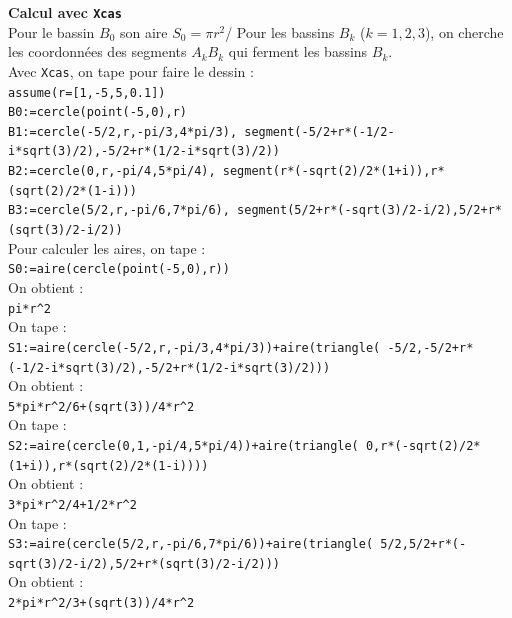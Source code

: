 \documentclass[a4paper,11pt]{book}
\begin{document}
{\bf Calcul avec {\tt Xcas}}\\
Pour le bassin $B_0$ son aire $S_0=\pi r^2$/
Pour les bassins $B_k$ ($k=1,2,3$), on cherche les coordonn\'ees des segments 
$A_kB_k$ qui ferment les bassins $B_k$.\\
Avec {\tt Xcas}, on tape pour faire le dessin :\\
{\tt assume(r=[1,-5,5,0.1])}\\
{\tt B0:=cercle(point(-5,0),r)}\\
{\tt B1:=cercle(-5/2,r,-pi/3,4*pi/3),
segment(-5/2+r*(-1/2-i*sqrt(3)/2),-5/2+r*(1/2-i*sqrt(3)/2))}\\
{\tt B2:=cercle(0,r,-pi/4,5*pi/4),
segment(r*(-sqrt(2)/2*(1+i)),r*(sqrt(2)/2*(1-i)))}\\
{\tt B3:=cercle(5/2,r,-pi/6,7*pi/6),
segment(5/2+r*(-sqrt(3)/2-i/2),5/2+r*(sqrt(3)/2-i/2))}\\
Pour calculer les aires, on tape :\\
{\tt S0:=aire(cercle(point(-5,0),r))}\\
On obtient :\\
{\tt pi*r\verb|^|2}\\
On tape :\\
{\tt S1:=aire(cercle(-5/2,r,-pi/3,4*pi/3))+aire(triangle(
 -5/2,-5/2+r*(-1/2-i*sqrt(3)/2),-5/2+r*(1/2-i*sqrt(3)/2)))}\\
On obtient :\\
{\tt 5*pi*r\verb|^|2/6+(sqrt(3))/4*r\verb|^|2}\\
On tape :\\
{\tt S2:=aire(cercle(0,1,-pi/4,5*pi/4))+aire(triangle(
0,r*(-sqrt(2)/2*(1+i)),r*(sqrt(2)/2*(1-i))))}\\
On obtient :\\
{\tt 3*pi*r\verb|^|2/4+1/2*r\verb|^|2}\\
On tape :\\
{\tt S3:=aire(cercle(5/2,r,-pi/6,7*pi/6))+aire(triangle(
5/2,5/2+r*(-sqrt(3)/2-i/2),5/2+r*(sqrt(3)/2-i/2)))}\\
On obtient :\\
{\tt 2*pi*r\verb|^|2/3+(sqrt(3))/4*r\verb|^|2}\\
\end{document}
